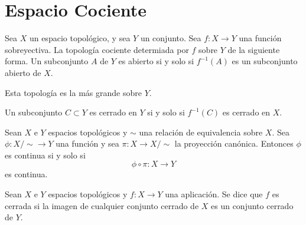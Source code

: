 \documentclass{./Topologia.tex}
\begin{document}
\chapter{Espacio Cociente}
\begin{defin}
    Sea \(X\) un espacio topológico, y sea \(Y\) un conjunto. Sea \(f:X \to Y\) una función
    sobreyectiva. La topología cociente determiada por \(f\) sobre \(Y\) de la siguiente forma.
    Un subconjunto \(A\) de \(Y\) es abierto si y solo si \(f^{-1}(A)\) es un subconjunto
    abierto de \(X\).
\end{defin}
Esta topología es la más grande sobre \(Y\).
\begin{prop}
    Un subconjunto \(C \subset Y\) es cerrado en \(Y\) si y solo si \(f^{-1}(C)\) es cerrado
    en \(X\).
\end{prop}
\begin{teorema}
    Sean \(X\) e \(Y\) espacios topológicos y \(\sim\) una relación de equivalencia sobre
    \(X\). Sea \(\phi :X / \sim \to Y\) una función y sea \(\pi: X \to  X / \sim\) la
    proyección canónica. Entonces \(\phi \) es continua si y solo si
    \[
        \phi \circ \pi: X \to Y
    \]
    es continua.
\end{teorema}
\begin{defin}
    Sean \(X\) e \(Y\) espacios topológicos y \(f:X \to  Y\) una aplicación. Se dice que
    \(f\) es cerrada si la imagen de cualquier conjunto cerrado de \(X\) es un conjunto cerrado
    de \(Y\).
\end{defin}
\end{document}
